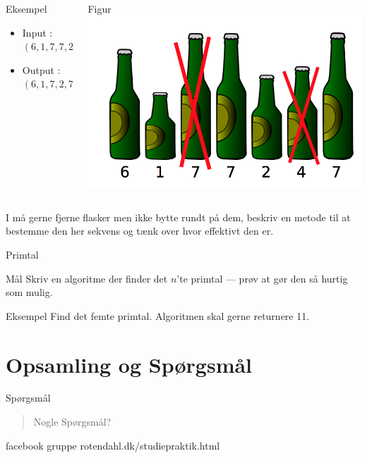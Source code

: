 \documentclass[12pt,t]{beamer}
\begin{document}
\begin{frame}
  \begin{columns}
      \begin{column}{0.5\textwidth}
          \begin{block}{Eksempel}
            \begin{itemize}
                \item Input : $(6, 1, 7, 7, 2, 4, 7)$
                \item Output : $(6,1,7,2,7)$
            \end{itemize}
          \end{block}
      \end{column}
      \begin{column}{0.5\textwidth}
          \begin{block}{Figur}
            \includegraphics[scale=0.3]{oel.png}
          \end{block}
      \end{column}
  \end{columns}
    I må gerne fjerne flasker men ikke bytte rundt på dem, beskriv en metode
    til at bestemme den her sekvens og tænk over hvor effektivt den er.
\end{frame}


\begin{frame}{Primtal}
  \begin{block}{Mål}
  Skriv en algoritme der finder det $n$'te primtal --- prøv at gør den så
  hurtig som mulig.
  \end{block}
  \pause

  \begin{exampleblock}{Eksempel}
  Find det femte primtal. Algoritmen skal gerne returnere 11.
  \end{exampleblock}
\end{frame}



\section{Opsamling og Spørgsmål}
    \begin{frame}[c]{Spørgsmål}
        \begin{quote}
            \centering Nogle Spørgsmål?
        \end{quote}
        \begin{block}{facebook gruppe}
            rotendahl.dk/studiepraktik.html
        \end{block}
    \end{frame}
\end{document}
